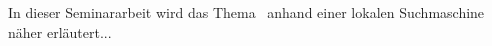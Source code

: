 In dieser Seminararbeit wird das Thema \glqq \Titel\grqq\ anhand einer lokalen Suchmaschine näher erläutert...
